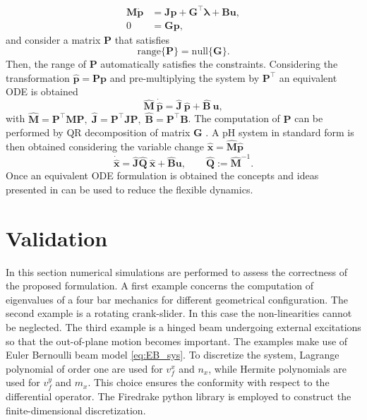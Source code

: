 \documentclass{svjour3}                     %
\begin{document}
\begin{equation}
\begin{aligned}
\mathbf{M} \dot{\mathbf{p}} &=  \mathbf{J}\mathbf{p} + \mathbf{G}^\top \bm{\lambda} + \mathbf{B}\mathbf{u}, \\ 
0 &= \mathbf{G}\mathbf{p},
\end{aligned}
\end{equation}
and consider a matrix $\mathbf{P}$ that satisfies 
\[
\mathrm{range}\{\mathbf{P}\} = \mathrm{null}\{\mathbf{G}\}.
\]
Then, the range of $\mathbf{P}$ automatically satisfies the constraints. Considering the transformation $\widehat{\mathbf{p}} = \mathbf{P} \mathbf{p}$ and pre-multiplying the system by $\mathbf{P}^\top$ an equivalent ODE is obtained
\[
\widehat{\mathbf{M}} \ \dot{\widehat{\mathbf{p}}} =  \widehat{\mathbf{J}} \ \widehat{\mathbf{p}} + \widehat{\mathbf{B}} \ \mathbf{u},
\]
with $\widehat{\mathbf{M}} = \mathbf{P}^\top \mathbf{M} \mathbf{P}, \; \widehat{\mathbf{J}} = \mathbf{P}^\top \mathbf{J} \mathbf{P}, \; \widehat{\mathbf{B}} = \mathbf{P}^\top \mathbf{B}$. The computation of $\mathbf{P}$ can be performed by QR decomposition of matrix $\mathbf{G}$ \cite{nullspaceFlMult}. A pH system in standard form is then obtained considering the variable change $\widehat{\mathbf{x}} = \widehat{\mathbf{M}} \widehat{\mathbf{p}}$
\[ \dot{\widehat{\mathbf{x}}} =  \widehat{\mathbf{J}} \widehat{\mathbf{Q}}\ \widehat{\mathbf{x}} + \widehat{\mathbf{B}}  \mathbf{u}, \qquad \widehat{\mathbf{Q}}:= \widehat{\mathbf{M}}^{-1}.
\] 
Once an equivalent ODE formulation is obtained the concepts and ideas presented in \cite{phode_red} can be used to reduce the flexible dynamics.

\section{Validation}
\label{sec:valid}
In this section numerical simulations are performed to assess the correctness of the proposed formulation. A first example concerns the computation of eigenvalues of a four bar mechanics for different geometrical configuration. The second example is a rotating crank-slider. In this case the non-linearities cannot be neglected. The third example is a hinged beam undergoing external excitations so that the out-of-plane motion becomes important. The examples make use of Euler Bernoulli beam model \eqref{eq:EB_sys}. To discretize the system, Lagrange polynomial of order one are used for $v_f^x$ and $n_x$, while Hermite polynomials are used for $v_f^y$ and $m_{x}$. This choice ensures the conformity with respect to the differential operator. The Firedrake python library \cite{rathgeber2017firedrake} is employed to construct the finite-dimensional discretization.  
\end{document}
